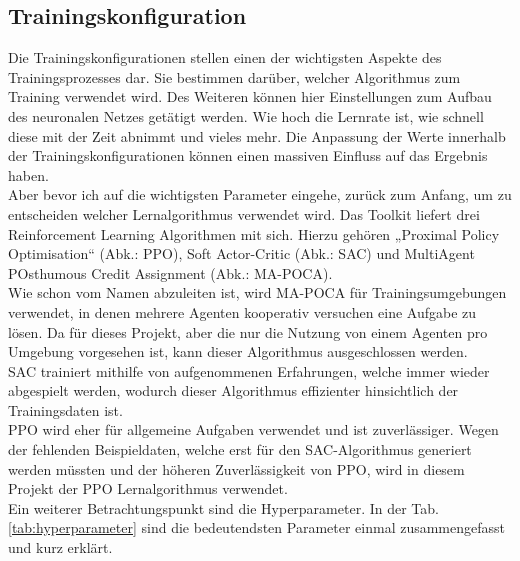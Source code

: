 \subsection{Trainingskonfiguration}
\label{trainingskonfiguration}
Die Trainingskonfigurationen stellen einen der wichtigsten Aspekte des Trainingsprozesses dar. Sie bestimmen darüber, welcher Algorithmus zum Training verwendet wird. Des Weiteren können hier Einstellungen zum Aufbau des neuronalen Netzes getätigt werden. Wie hoch die Lernrate ist, wie schnell diese mit der Zeit abnimmt und vieles mehr. Die Anpassung der Werte innerhalb der Trainingskonfigurationen können einen massiven Einfluss auf das Ergebnis haben. 
\\
Aber bevor ich auf die wichtigsten Parameter eingehe, zurück zum Anfang, um zu entscheiden welcher Lernalgorithmus verwendet wird. Das Toolkit liefert drei Reinforcement Learning Algorithmen mit sich. Hierzu gehören „Proximal Policy Optimisation“ (Abk.: PPO), Soft Actor-Critic (Abk.: SAC) und MultiAgent POsthumous Credit Assignment (Abk.: MA-POCA). 
\\
Wie schon vom Namen abzuleiten ist, wird MA-POCA für Trainingsumgebungen verwendet, in denen mehrere Agenten kooperativ versuchen eine Aufgabe zu lösen. Da für dieses Projekt, aber die nur die Nutzung von einem Agenten pro Umgebung vorgesehen ist, kann dieser Algorithmus ausgeschlossen werden.\cite{mapoca}
\\
SAC trainiert mithilfe von aufgenommenen Erfahrungen, welche immer wieder abgespielt werden, wodurch dieser Algorithmus effizienter hinsichtlich der Trainingsdaten ist.\cite{sac}
\\
PPO wird eher für allgemeine Aufgaben verwendet und ist zuverlässiger.\cite{mapoca} Wegen der fehlenden Beispieldaten, welche erst für den SAC-Algorithmus generiert werden müssten und der höheren Zuverlässigkeit von PPO, wird in diesem Projekt der PPO Lernalgorithmus verwendet.
\\
Ein weiterer Betrachtungspunkt sind die Hyperparameter. In der Tab.\ref{tab:hyperparameter} sind die bedeutendsten Parameter einmal zusammengefasst und kurz erklärt. 
